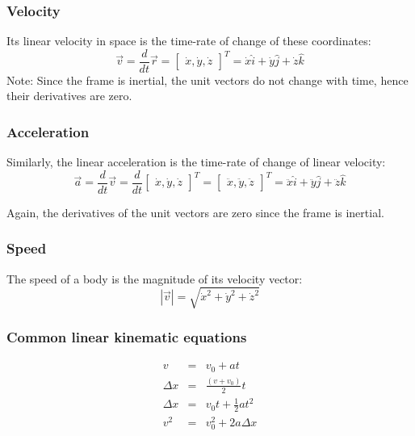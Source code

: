 \documentclass[a4paper,12pt]{article}
\begin{document}
\subsubsection{Velocity}
Its linear velocity in space is the time-rate of change of these coordinates:
\begin{equation} \nonumber
        \vec{v} = \frac{d}{dt}
        \vec{r} =
        \begin{bmatrix}
            \dot{x}, \dot{y}, \dot{z}
        \end{bmatrix}^T = 
        \dot{x} \hat{i} + \dot{y} \hat{j} + \dot{z} \hat{k}
\end{equation}
Note: Since the frame is inertial, the unit vectors do not change with time, hence their derivatives are zero.

\subsubsection{Acceleration}
Similarly, the linear acceleration is the time-rate of change of linear velocity:
\begin{equation} \nonumber
    \vec{a} = \frac{d}{dt} \vec{v}
    = \frac{d}{dt} \begin{bmatrix}
        \dot{x}, \dot{y}, \dot{z}
    \end{bmatrix}^T = \begin{bmatrix}
        \ddot{x}, \ddot{y}, \ddot{z}
    \end{bmatrix}^T = 
    \ddot{x} \hat{i} + \ddot{y} \hat{j} + \ddot{z} \hat{k}
\end{equation}

Again, the derivatives of the unit vectors are zero since the frame is inertial.

\subsubsection{Speed}
The speed of a body is the magnitude of its velocity vector:
\begin{equation} \nonumber
    |\vec{v}| = \sqrt{\dot{x}^2 + \dot{y}^2 + \dot{z}^2}
\end{equation}

\subsubsection{Common linear kinematic equations}
\begin{equation} \nonumber
    \begin{aligned}
        v & = & v_0 + at \\
        \Delta x & = & \frac{(v + v_0)}{2} t \\
        \Delta x & = & v_0 t + \frac{1}{2} a t^2 \\
        v^2 & = & v_0^2 + 2 a \Delta x
    \end{aligned}
\end{equation}
\end{document}
